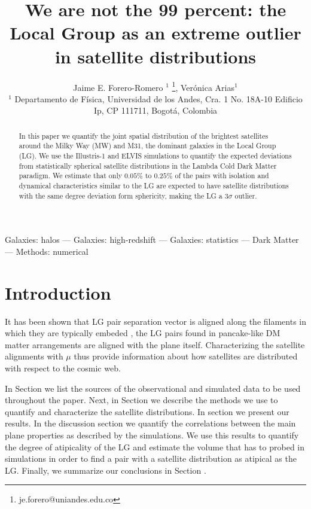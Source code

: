 \documentclass[a4paper,fleqn,usenatbib]{mnras}
\begin{document}
\title[LG as an outlier]{We are not the 99 percent: the Local Group as an
  extreme outlier in satellite distributions}
\author[J.E. Forero-Romero \& V. Arias]
{Jaime E. Forero-Romero $^{1}$ \thanks{je.forero@uniandes.edu.co},
Ver\'onica Arias$^1$\\
$^1$ Departamento de F\'isica, Universidad de los Andes, Cra. 1
  No. 18A-10 Edificio Ip, CP 111711, Bogot\'a, Colombia \\
}

\maketitle

\begin{abstract}
In this paper we quantify the joint spatial distribution of the
brightest satellites around the Milky Way (MW) and M31, the dominant
galaxies in the Local Group (LG).
We use the Illustris-1 and ELVIS simulations to quantify the
expected deviations from statistically spherical satellite
distributions in the Lambda Cold Dark Matter paradigm. 
We estimate that only $0.05\%$ to $0.25\%$ of the pairs with isolation
and dynamical characteristics similar to the LG are expected to have
satellite distributions with the same degree deviation form
sphericity, making the LG a $3\sigma$ outlier.  
\end{abstract}

\begin{keywords}Galaxies: halos --- Galaxies: high-redshift --- Galaxies: statistics
--- Dark Matter --- Methods: numerical 
\end{keywords}

\section{Introduction}

 
It has been shown that LG pair separation vector is aligned along the
filaments in  which they are typically embeded
\cite{2015ApJ...799...45F}, the LG pairs found in pancake-like DM
matter arrangements are aligned with the plane itself. 
Characterizing the satellite alignments with $\mu$ thus provide
information about how satellites are distributed with respect to the
cosmic web. 

In Section we list the sources of the observational and
simulated data to be used throughout the paper.
Next, in Section we describe the methods we use to quantify and
characterize the satellite distributions.
In section we present our results. 
In the discussion section we quantify the correlations between the main
plane properties as described by the simulations.
We use this results to quantify the degree of atipicality of the LG
and estimate the volume that has to probed in simulations in order to
find a pair with a satellite distribution as atipical as the LG. 
Finally, we summarize our conclusions in Section .
\end{document}
